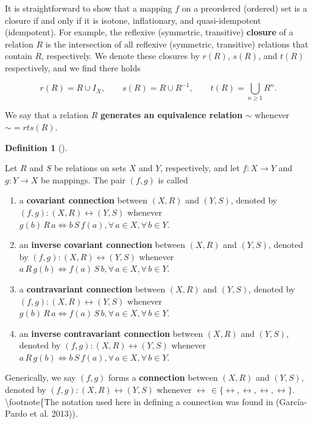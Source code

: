 \documentclass[
  letterpaper,
  10pt,
  reqno,
  twopage,
  openany]{book}
\providecommand{\tightlist}{%
  \setlength{\itemsep}{0pt}\setlength{\parskip}{0pt}}\usepackage{longtable,booktabs,array}
\theoremstyle{plain}
\theoremstyle{definition}
\theoremstyle{definition}
\newtheorem{definition}{Definition}[chapter]
\theoremstyle{definition}
\theoremstyle{plain}
\theoremstyle{plain}
\theoremstyle{remark}
\begin{document}
It is straightforward to show that a mapping \(f\) on a preordered
(ordered) set is a closure if and only if it is isotone, inflationary,
and quasi-idempotent (idempotent). For example, the reflexive
(symmetric, transitive)  \textbf{closure} of a relation
\(R\) is the intersection of all reflexive (symmetric, transitive)
relations that contain \(R\), respectively. We denote these closures by
\(r(R)\), \(s(R)\), and \(t(R)\) respectively, and we find there holds

\begin{equation}
\label{relclsoure}
r(R)=R \cup I_X, \qquad
s(R)=R \cup R^{-1}, \qquad
t(R)=\bigcup_{n\geq 1} R^n. 
\end{equation}

We say that a relation \(R\) 
\textbf{generates an equivalence relation} \(\sim\) whenever
\(\sim = rts(R)\).

\leavevmode{}%
\begin{definition}[]\label{def-connections}

Let \(R\) and \(S\) be relations on sets \(X\) and \(Y\), respectively,
and let \(f:X\to Y\) and \(g:Y\to X\) be mappings. The pair \((f,g)\) is
called

\begin{enumerate}
\def\labelenumi{\arabic{enumi}.}
\tightlist
\item
  a  \textbf{covariant connection} between
  \((X,R)\) and \((Y,S)\), denoted by
  \({(f,g):(X,R) \leftrightarrow (Y,S)}\) whenever
  \(g(b) \,R\, a \Leftrightarrow b\,S\,f(a), \forall \, a\in X, \forall \, b\in Y.\)
\item
  an  \textbf{inverse covariant
  connection} between \((X,R)\) and \((Y,S)\), denoted by
  \({(f,g):(X,R) \leftrightarrow (Y,S)}\) whenever
  \(a\,R\, g(b) \Leftrightarrow f(a)\,S\,b, \forall \, a\in X, \forall \, b\in Y.\)
\item
  a  \textbf{contravariant connection}
  between \((X,R)\) and \((Y,S)\), denoted by
  \({(f,g):(X,R) \leftrightarrow (Y,S)}\) whenever
  \(g(b)\,R\,a \Leftrightarrow f(a)\,S\,b, \forall \, a\in X, \forall \, b\in Y.\)
\item
  an  \textbf{inverse
  contravariant connection} between \((X,R)\) and \((Y,S)\), denoted by
  \({(f,g):(X,R) \leftrightarrow (Y,S)}\) whenever
  \(a\,R\,g(b) \Leftrightarrow b\,S\, f(a), \forall \, a\in X, \forall \, b\in Y.\)
\end{enumerate}

Generically, we say \((f,g)\) forms a 
\textbf{connection} between \((X,R)\) and \((Y,S)\), denoted by
\({(f,g):(X,R) \leftrightarrow (Y,S)}\) whenever
\(\leftrightarrow\,\in\{\leftrightarrow, \leftrightarrow,\leftrightarrow,\leftrightarrow\}\).
\textbackslash footnote\{The notation used here in defining a connection
was found in (García-Pardo et al. 2013)).

\end{definition}
\end{document}
